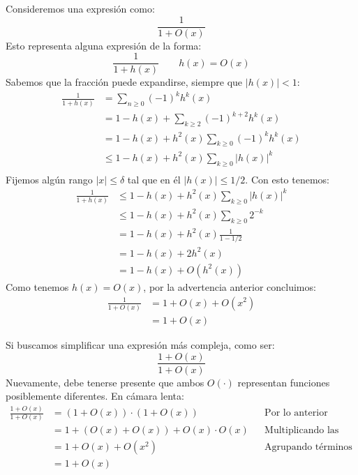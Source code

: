 \documentclass[spanish, fleqn]{article}
\begin{document}
  Consideremos una expresión como:
  \begin{equation*}
    \frac{1}{1 + O(x)}
  \end{equation*}
  Esto representa alguna expresión de la forma:
  \begin{equation*}
    \frac{1}{1 + h(x)} \qquad h(x) = O(x)
  \end{equation*}
  Sabemos que la  fracción puede expandirse,
  siempre que \(\lvert h(x) \rvert < 1\):
  \begin{align*}
    \frac{1}{1 + h(x)}
      &=   \sum_{n \ge 0} (-1)^k h^k(x) \\
      &=   1 - h(x) + \sum_{k \ge 2} (-1)^{k + 2} h^k(x) \\
      &=   1 - h(x) + h^2(x) \sum_{k \ge 0}(-1)^k h^k(x) \\
      &\le 1 - h(x) + h^2(x) \sum_{k \ge 0} \lvert h(x) \rvert^k \\
  \end{align*}
  Fijemos algún rango \(\lvert x \rvert \le \delta\)
  tal que en él \(\lvert h(x) \rvert \le 1 / 2\).
  Con esto tenemos:
  \begin{align*}
    \frac{1}{1 + h(x)}
      &\le 1 - h(x) + h^2(x) \sum_{k \ge 0} \lvert h(x) \rvert^k \\
      &\le 1 - h(x) + h^2(x) \sum_{k \ge 0} 2^{-k} \\
      &=   1 - h(x) + h^2(x) \frac{1}{1 - 1/2} \\
      &=   1 - h(x) + 2 h^2(x) \\
      &=   1 - h(x) + O(h^2(x))
  \end{align*}
  Como tenemos \(h(x) = O(x)\),
  por la advertencia anterior concluimos:
  \begin{align*}
    \frac{1}{1 + O(x)}
      &= 1 + O(x) + O(x^2) \\
      &= 1 + O(x)
  \end{align*}

  Si buscamos simplificar una expresión más compleja,
  como ser:
  \begin{equation*}
    \frac{1 + O(x)}{1 + O(x)}
  \end{equation*}
  Nuevamente,
  debe tenerse presente que ambos \(O(\cdot)\)
  representan funciones posiblemente diferentes.
  En cámara lenta:
  \begin{align*}
    \frac{1 + O(x)}{1 + O(x)}
       &= (1 + O(x)) \cdot (1 + O(x))
           && \text{Por lo anterior} \\
       &= 1 + (O(x) + O(x)) + O(x) \cdot O(x)
           && \text{Multiplicando las dos expresiones} \\
       &= 1 + O(x) + O(x^2)
           && \text{Agrupando términos y simplificando} \\
       &= 1 + O(x)
  \end{align*}
\end{document}
